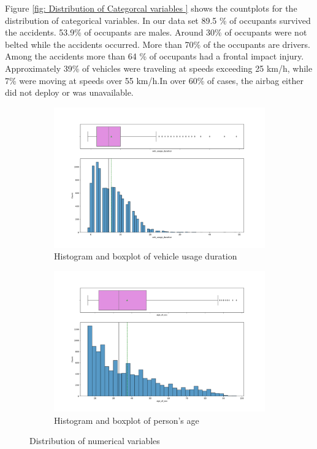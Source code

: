 \documentclass[12pt,a4paper]{article}
\begin{document}
	Figure \ref{fig: Distribution of Categorcal variables } shows the countplots for the distribution of categorical variables. In our data set 89.5 \% of occupants survived the accidents. 53.9\% of occupants are males. Around 30\% of occupants were not belted while the accidents occurred. More than 70\% of the occupants are drivers. Among the accidents more than 64 \% of occupants had a frontal impact injury. Approximately 39\% of vehicles were traveling at speeds exceeding 25 km/h, while 7\% were moving at speeds over 55 km/h.In over 60\% of cases, the airbag either did not deploy or was unavailable.
	\begin{figure}[h]
		\centering
		\begin{subfigure}[t]{0.495\linewidth}
			\centering
			\includegraphics[width=\linewidth]{veh_duration_dist.png}
			\caption{Histogram and boxplot of vehicle usage duration}
			\label{fig:veh_duration_dist}
		\end{subfigure}
		\hfill
		\begin{subfigure}[t]{0.495\linewidth}
			\centering
			\includegraphics[width=\linewidth]{age_dist.png}
			\caption{Histogram and boxplot of person's age}
			\label{fig:age_dist}
		\end{subfigure}
		\caption{Distribution of numerical variables}
		\label{fig: Distribution of numerical variables }
	\end{figure}
\end{document}

